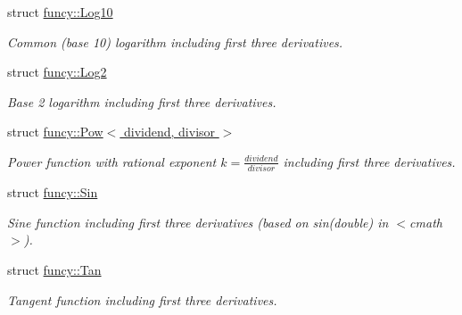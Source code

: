 \begin{DoxyCompactItemize}
struct \hyperlink{structfuncy_1_1Log10}{funcy\-::\-Log10}
\begin{DoxyCompactList}\small\item\em Common (base 10) logarithm including first three derivatives. \end{DoxyCompactList}\item 
struct \hyperlink{structfuncy_1_1Log2}{funcy\-::\-Log2}
\begin{DoxyCompactList}\small\item\em Base 2 logarithm including first three derivatives. \end{DoxyCompactList}\item 
struct \hyperlink{structfuncy_1_1Pow}{funcy\-::\-Pow$<$ dividend, divisor $>$}
\begin{DoxyCompactList}\small\item\em Power function with rational exponent $ k = \frac{dividend}{divisor} $ including first three derivatives. \end{DoxyCompactList}\item 
struct \hyperlink{structfuncy_1_1Sin}{funcy\-::\-Sin}
\begin{DoxyCompactList}\small\item\em Sine function including first three derivatives (based on sin(double) in $<$cmath$>$). \end{DoxyCompactList}\item 
struct \hyperlink{structfuncy_1_1Tan}{funcy\-::\-Tan}
\begin{DoxyCompactList}\small\item\em Tangent function including first three derivatives. \end{DoxyCompactList}\end{DoxyCompactItemize}
